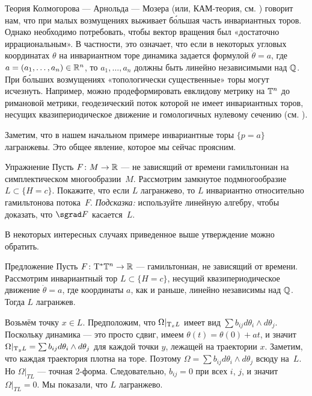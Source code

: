 Теория Колмогорова --- Арнольда --- Мозера (или, КАМ-теория, см. \cite{Ar})
говорит нам, что при малых возмущениях выживает б\'{о}льшая часть
инвариантных торов. 
Однако необходимо потребовать, чтобы вектор вращения был «достаточно
иррациональным». 
В частности, это означает, что если в некоторых угловых координатах
$\theta$ на инвариантном торе динамика задается формулой $\dot\theta =
a$, где $a = (a_1 ,\dots, a_n) \in \mathbb{R}^n$, то $a_1 ,\dots, a_n$ должны
быть линейно независимыми над $\mathbb{Q}$. 
При б\'{о}льших возмущениях «топологически существенные» торы могут исчезнуть.
Например, можно продеформировать евклидову метрику на $\mathbb{T}^n$ до
римановой метрики, геодезический поток которой не имеет инвариантных
торов, несущих квазипериодическое движение и гомологичных нулевому
сечению (см. \cite{AL}). 

Заметим, что в нашем начальном примере инвариантные торы $\{p = a\}$
лагранжевы. 
Это общее явление, которое мы сейчас проясним.

\begin{ex}{Упражнение}\label{8.1.A}
Пусть $F\colon M \to \mathbb{R}$ --- не зависящий от времени гамильтониан на симплектическом многообразии~$M$.
Рассмотрим замкнутое подмногообразие $L \subset \{H = c\}$.
Покажите, что если $L$ лагранжево, то $L$ инвариантно относительно гамильтонова потока~$F$.
\emph{Подсказка:} используйте линейную алгебру, чтобы доказать, что $\sgrad F$ касается~$L$.
\end{ex}

В некоторых интересных случаях приведенное выше утверждение можно обратить.

\begin{thm}[(\cite{He})]{Предложение}\label{8.1.B}
Пусть $F\colon \mathrm{T}^\ast \mathbb{T}^n \to \mathbb{R}$ --- гамильтониан, не зависящий от времени.
Рассмотрим инвариантный тор $L \subset \{H = c\}$, несущий квазипериодическое движение $\dot\theta = a$, где координаты $a$, как и раньше, линейно независимы над $\mathbb{Q}$.
Тогда $L$ лагранжев.
\end{thm}

Возьмём точку $x \in L$.
Предположим, что $\Omega|_{\mathrm{T}_x L}$ имеет вид $\sum b_{ij} d\theta_i
\wedge d\theta_j$. 
Поскольку динамика --- это просто сдвиг, имеем $\theta (t) = \theta
(0) + at$, и значит $\Omega|_{\mathrm{T}_y L} = \sum b_{ij} d\theta_i \wedge d\theta_j$ для каждой точки $y$, лежащей на траектории $x$. 
Заметим, что каждая траектория плотна на торе.
Поэтому $\Omega = \sum b_{ij} d\theta_i \wedge d\theta_j$ всюду на~$L$.
Но $\Omega|_{TL}$ --- точная 2-форма.
Следовательно, $b_{ij} = 0$ при всех $i$, $j$, и значит $\Omega|_{T L} = 0$. 
Мы показали, что $L$ лагранжево.
\qeds


